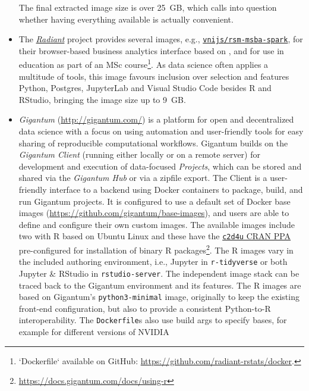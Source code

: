 \begin{itemize}
  The final extracted image size is over 25~GB, which calls into
  question whether having everything available is actually convenient.
\item
  The \href{https://radiant-rstats.github.io/docs/}{\emph{Radiant}}
  project provides several images, e.g.,
  \href{https://hub.docker.com/r/vnijs/rsm-msba-spark}{\texttt{vnijs/rsm-msba-spark}},
  for their browser-based business analytics interface based on
   \citep{cran_shiny}, and for use in education as part
  of an MSc
  course\footnote{`Dockerfile` available on GitHub: \href{https://github.com/radiant-rstats/docker}{https://github.com/radiant-rstats/docker}.}.
  As data science often applies a multitude of tools, this image favours
  inclusion over selection and features Python, Postgres, JupyterLab and
  Visual Studio Code besides R and RStudio, bringing the image size up
  to 9~GB.
\item
  \emph{Gigantum} (\url{http://gigantum.com/}) is a platform for open
  and decentralized data science with a focus on using automation and
  user-friendly tools for easy sharing of reproducible computational
  workflows. Gigantum builds on the \emph{Gigantum Client} (running
  either locally or on a remote server) for development and execution of
  data-focused \emph{Projects}, which can be stored and shared via the
  \emph{Gigantum Hub} or via a zipfile export. The Client is a
  user-friendly interface to a backend using Docker containers to
  package, build, and run Gigantum projects. It is configured to use a
  default set of Docker base images
  (\url{https://github.com/gigantum/base-images}), and users are able to
  define and configure their own custom images. The available images
  include two with R based on Ubuntu Linux and these have the
  \href{https://launchpad.net/~marutter/+archive/ubuntu/c2d4u3.5/}{\texttt{c2d4u}
  CRAN PPA} pre-configured for installation of binary R
  packages\footnote{\href{https://docs.gigantum.com/docs/using-r}{https://docs.gigantum.com/docs/using-r}}.
  The R images vary in the included authoring environment, i.e., Jupyter
  in \texttt{r-tidyverse} or both Jupyter \& RStudio in
  \texttt{rstudio-server}. The independent image stack can be traced
  back to the Gigantum environment and its features. The R images are
  based on Gigantum's \texttt{python3-minimal} image, originally to keep
  the existing front-end configuration, but also to provide a consistent
  Python-to-R interoperability. The \texttt{Dockerfile}s also use build
  args to specify bases, for example for different versions of NVIDIA

\end{itemize}
